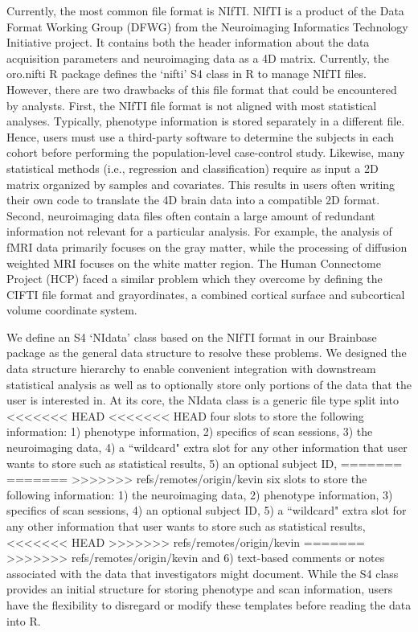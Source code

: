 \documentclass{nature}
\begin{document}
Currently, the most common file format is NIfTI.
NIfTI is a product of the Data Format Working Group
(DFWG) from the Neuroimaging Informatics Technology Initiative project. It
contains both the header information about the data acquisition
parameters and neuroimaging data as a 4D matrix.
Currently, the oro.nifti R package defines the `nifti'
S4 class in R to manage NIfTI files. However, there are two drawbacks
of this file format that could be encountered by analysts. 
First, the NIfTI file format is not aligned with
most statistical analyses. Typically,
phenotype information is stored separately in a different file. Hence, users must use a third-party software to determine the subjects in each cohort before performing the population-level case-control study. Likewise, many
statistical
methods (i.e., regression and classification) require as input a 2D matrix organized by samples and covariates. This results in users often writing 
their own code to translate the 4D brain data 
into a compatible 2D format.
Second, neuroimaging
data files often contain a large amount of
redundant information not relevant for a particular
analysis.
For example,
the analysis of fMRI data primarily focuses on the gray matter, while the
processing of diffusion weighted MRI focuses on the white matter region. The Human Connectome Project (HCP) faced a similar problem which they
overcome by defining the
CIFTI
file format and grayordinates, a combined cortical surface and subcortical
volume coordinate system\cite{Glasser2013The}. 


We define an S4 `NIdata' class based on the NIfTI format
in our Brainbase package as
the general data structure to resolve these problems. We designed
the data structure hierarchy to enable convenient integration with
downstream
statistical analysis as well as to optionally store only portions of the
data that the user is interested in.
At its core, the NIdata class is a generic file type split into
<<<<<<< HEAD
<<<<<<< HEAD
four slots to store the following information: 1) phenotype
information, 2) specifics of scan sessions, 3) the neuroimaging data,
4) a ``wildcard" extra slot for any other information that user
wants to store such as statistical results, 5) an optional subject ID,
=======
=======
>>>>>>> refs/remotes/origin/kevin
six slots to store the following information: 1) the neuroimaging data,
2) phenotype
information, 3) specifics of scan sessions,  4) an optional subject ID,
5) a ``wildcard" extra slot for any other information that user
wants to store such as statistical results,
<<<<<<< HEAD
>>>>>>> refs/remotes/origin/kevin
=======
>>>>>>> refs/remotes/origin/kevin
and 6) text-based comments or notes associated with the data that
investigators might document. While the
S4 class provides an initial structure for storing
phenotype and scan information, users have the flexibility to disregard or
modify these templates before reading the data into R.
\end{document}
